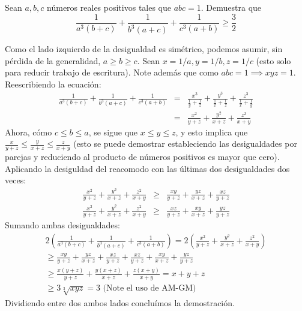 \documentclass[11pt]{scrartcl}
\begin{document}
\begin{example}
\label{IMO1995-P2}
Sean $a, b, c$ n\'umeros reales positivos tales que $abc = 1$. Demuestra que
\begin{equation*}
    \frac{1}{a^3\left(b+c\right)} + \frac{1}{b^3\left(a+c\right)} + \frac{1}{c^3\left(a+b\right)} \geq \frac{3}{2}
\end{equation*}
\end{example}
\begin{soln}
Como el lado izquierdo de la desigualdad es sim\'etrico, podemos asumir, sin p\'erdida de la generalidad, $a \geq b \geq c$. Sean $x = 1/a, y = 1/b, z = 1/c$ (esto solo para reducir trabajo de escritura). Note adem\'as que como $abc = 1 \implies xyz = 1$. Reescribiendo la ecuaci\'on:
\begin{eqnarray*}
    \frac{1}{a^3\left(b+c\right)} + \frac{1}{b^3\left(a+c\right)} + \frac{1}{c^3\left(a+b\right)} &=& \frac{x^3}{\frac{1}{y} + \frac{1}{z}} + \frac{y^3}{\frac{1}{x} + \frac{1}{z}} + \frac{z^3}{\frac{1}{x} + \frac{1}{y}} \\
    &=& \frac{x^2}{y+z} + \frac{y^2}{x+z} + \frac{z^2}{x+y}
\end{eqnarray*}
Ahora, c\'omo $c \leq b \leq a$, se sigue que $x \leq y \leq z$, y esto implica que $\frac{x}{y+z} \leq \frac{y}{x+z} \leq \frac{z}{x+y}$ (esto se puede demostrar estableciendo las desigualdades por parejas y reduciendo al producto de n\'umeros positivos es mayor que cero). Aplicando la desiguldad del reacomodo con las \'ultimas dos desigualdades dos veces:
\begin{eqnarray*}
    \frac{x^2}{y+z} + \frac{y^2}{x+z} + \frac{z^2}{x+y} &\geq& \frac{xy}{y+z} + \frac{yz}{x+z} + \frac{xz}{y+z}\\
    \frac{x^2}{y+z} + \frac{y^2}{x+z} + \frac{z^2}{x+y} &\geq& \frac{xz}{y+z} + \frac{xy}{x+z} + \frac{yz}{y+z}
\end{eqnarray*}
Sumando ambas desigualdades:
\begin{eqnarray*}
    2\left(\frac{1}{a^3\left(b+c\right)} + \frac{1}{b^3\left(a+c\right)} + \frac{1}{c^3\left(a+b\right)}\right) = 2\left(\frac{x^2}{y+z} + \frac{y^2}{x+z} + \frac{z^2}{x+y}\right) \\
    \geq \frac{xy}{y+z} + \frac{yz}{x+z} + \frac{xz}{y+z} + \frac{xz}{y+z} + \frac{xy}{x+z} + \frac{yz}{y+z}\\
    \geq \frac{x\left(y+z\right)}{y+z} + \frac{y\left(x+z\right)}{x+z} + \frac{z\left(x+y\right)}{x+y} = x + y + z\\
    \geq 3\sqrt[3]{xyz} = 3 \text{ (Note el uso de AM-GM)}
\end{eqnarray*}
Dividiendo entre dos ambos lados conclu\'imos la demostraci\'on.
\end{soln}
\end{document}
